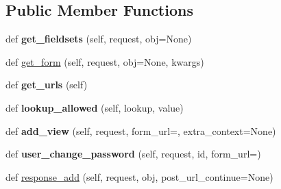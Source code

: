 \subsection*{Public Member Functions}
\begin{DoxyCompactItemize}
\item 
\mbox{\label{classdjango_1_1contrib_1_1auth_1_1admin_1_1_user_admin_a018dc3d5472ed20f8a5a426476063886}} 
def {\bfseries get\+\_\+fieldsets} (self, request, obj=None)
\item 
def \mbox{\hyperlink{classdjango_1_1contrib_1_1auth_1_1admin_1_1_user_admin_aeae77e3695f8ca0e33cc6d470fb33f3e}{get\+\_\+form}} (self, request, obj=None, kwargs)
\item 
\mbox{\label{classdjango_1_1contrib_1_1auth_1_1admin_1_1_user_admin_ab8885c1442b762a4155bc698fafe1974}} 
def {\bfseries get\+\_\+urls} (self)
\item 
\mbox{\label{classdjango_1_1contrib_1_1auth_1_1admin_1_1_user_admin_a779311c988c476746dad862be9fc4a1e}} 
def {\bfseries lookup\+\_\+allowed} (self, lookup, value)
\item 
\mbox{\label{classdjango_1_1contrib_1_1auth_1_1admin_1_1_user_admin_a343c27750bcc883cf2252b23ef23607a}} 
def {\bfseries add\+\_\+view} (self, request, form\+\_\+url=\textquotesingle{}\textquotesingle{}, extra\+\_\+context=None)
\item 
\mbox{\label{classdjango_1_1contrib_1_1auth_1_1admin_1_1_user_admin_a4a929005f89dea9c6025bd3c4587879f}} 
def {\bfseries user\+\_\+change\+\_\+password} (self, request, id, form\+\_\+url=\textquotesingle{}\textquotesingle{})
\item 
def \mbox{\hyperlink{classdjango_1_1contrib_1_1auth_1_1admin_1_1_user_admin_ab68356aa10e52a94f8ab03590b6c3b40}{response\+\_\+add}} (self, request, obj, post\+\_\+url\+\_\+continue=None)
\end{DoxyCompactItemize}
